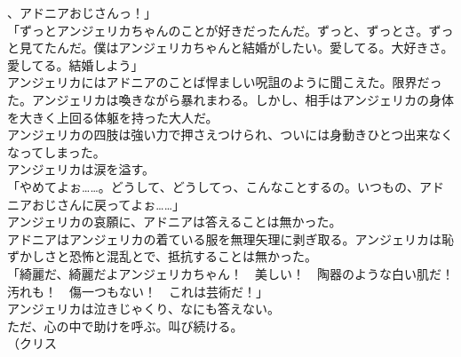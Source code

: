 \documentclass[b5j,10pt,openany]{jsbook}
\begin{document}
、アドニアおじさんっ！」\\「ずっとアンジェリカちゃんのことが好きだったんだ。ずっと、ずっとさ。ずっと見てたんだ。僕はアンジェリカちゃんと結婚がしたい。愛してる。大好きさ。愛してる。結婚しよう」\\アンジェリカにはアドニアのことば悍ましい呪詛のように聞こえた。限界だった。アンジェリカは喚きながら暴れまわる。しかし、相手はアンジェリカの身体を大きく上回る体躯を持った大人だ。\\アンジェリカの四肢は強い力で押さえつけられ、ついには身動きひとつ出来なくなってしまった。\\アンジェリカは涙を溢す。\\「やめてよぉ\ldots{}\ldots{}。どうして、どうしてっ、こんなことするの。いつもの、アドニアおじさんに戻ってよぉ\ldots{}\ldots{}」\\アンジェリカの哀願に、アドニアは答えることは無かった。\\アドニアはアンジェリカの着ている服を無理矢理に剥ぎ取る。アンジェリカは恥ずかしさと恐怖と混乱とで、抵抗することは無かった。\\「綺麗だ、綺麗だよアンジェリカちゃん！　美しい！　陶器のような白い肌だ！　汚れも！　傷一つもない！　これは芸術だ！」\\アンジェリカは泣きじゃくり、なにも答えない。\\ただ、心の中で助けを呼ぶ。叫び続ける。\\（クリス\ld
\end{document}
